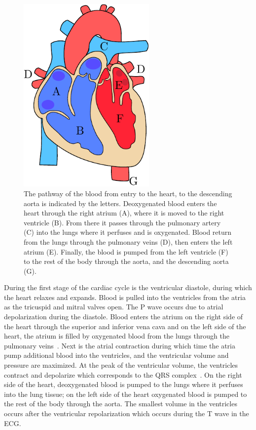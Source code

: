 \begin{figure}
    \centering
    \includegraphics[width=0.6\textwidth]{chapter2-background/imgs/heart_drawing.pdf}
    \caption[Sketch of the anatomical heart]{ The pathway of the blood
    from entry to the heart, to the descending aorta is indicated by the
    letters. Deoxygenated blood enters the heart through the right atrium
    (A), where it is moved to the right ventricle (B). From there it passes through 
    the pulmonary artery (C) into the lungs where it perfuses and is oxygenated. 
    Blood return from the lungs through the pulmonary veins (D), then enters 
    the left atrium (E). Finally, the blood is pumped from the left
    ventricle (F) to the rest of the body through the aorta, and the
    descending aorta (G).}
    \label{fig:anatomical_heart}
\end{figure}

During the first stage of the cardiac cycle is the ventricular
diastole, during which the heart relaxes and 
expands. Blood is pulled into the ventricles 
from the atria as the tricuspid and mitral valves open.
The P wave occurs due to atrial depolarization during the diastole.
Blood enters the atrium 
on the right side of the heart through the
superior and inferior vena cava and on the left side of the heart, the atrium is 
filled by oxygenated blood from the lungs through the pulmonary 
veins~\parencite{pappano_cardiovascular_2019}.
Next is the atrial contraction during which time the atria pump additional
blood into the ventricles, and the ventricular volume and pressure 
are maximized. At the peak of the ventricular volume, the ventricles contract 
and depolarize which corresponds to the QRS complex~\parencite{pollock_physiology_2021}. 
On the right side of the heart, deoxygenated blood is pumped 
to the lungs where it perfuses into the lung tissue; on the left side of 
the heart oxygenated blood is pumped to the rest of the body through the 
aorta. The smallest volume in the ventricles occurs after 
the ventricular repolarization which occurs during the T wave in the ECG.

